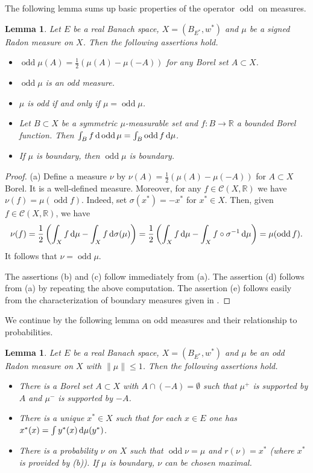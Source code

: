 \documentclass{amsart}
\numberwithin{equation}{section}
\newtheorem{lemma}[thm]{Lemma}
\theoremstyle{definition}
\def\C{\mathcal C}
\def\er{\mathbb R}
\def\odd{\operatorname{odd}}
\def\di{\,\mbox{\rm d}}
\begin{document}
The following lemma sums up basic properties of the operator $\odd$ on measures.

\begin{lemma}\label{l:odd-miry}
Let $E$ be a real Banach space, $X=(B_{E^*},w^*)$ and $\mu$ be a signed Radon measure on $X$.
Then the following assertions hold.
\begin{itemize}
	\item[(a)] $\odd\mu(A)=\frac12(\mu(A)-\mu(-A))$ for any  Borel set $A\subset X$.
	\item[(b)] $\odd\mu$ is an odd measure.
	\item[(c)] $\mu$ is odd if and only if $\mu=\odd\mu$.
	\item[(d)] Let $B\subset X$ be a symmetric $\mu$-measurable set and $f:B\to \er$ a bounded Borel function. Then $\int_B f\di\odd\mu=\int_B\odd
 f\di\mu$.
 \item[(e)] If $\mu$ is boundary, then $\odd\mu$ is boundary.
\end{itemize}
\end{lemma}

\begin{proof} (a) Define a measure $\nu$ by $\nu(A)=\frac12(\mu(A)-\mu(-A))$ for $A\subset X$ Borel. It is a well-defined measure. Moreover, for any $f\in\C(X,\er)$ we have $\nu(f)=\mu(\odd f)$. Indeed, set $\sigma(x^*)=-x^*$ for $x^*\in X$. Then, given $f\in\C(X,\er)$, we have
$$\nu(f)=\frac12\left(\int_X f\di\mu-\int_X f\di\sigma(\mu)\right)=\frac12\left(\int_X f\di\mu-\int_X f\circ \sigma^{-1}\di\mu\right)=\mu(\odd f).$$
It follows that $\nu=\odd\mu$.

The assertions (b) and (c) follow immediately from (a). The assertion (d) follows from (a) by repeating the above computation.
The assertion (e) follows easily from the characterization of boundary measures given in \cite[p. 34--35]{alfsen}.
 \end{proof}

We continue by the following lemma on odd measures and their relationship to probabilities.

\begin{lemma}\label{l:odd-miry2}
Let $E$ be a real Banach space, $X=(B_{E^*},w^*)$ and $\mu$ be an odd Radon measure on $X$ with $\|\mu\|\le 1$.
Then the following assertions hold.
\begin{itemize}
	\item[(a)] There is a Borel set $A\subset X$ with $A\cap(-A)=\emptyset$ such that $\mu^+$ is supported by $A$ and $\mu^-$ is supported by $-A$.
	\item[(b)] There is a unique $x^*\in X$ such that for each $x\in E$ one has $x^*(x)=\int y^*(x)\di\mu(y^*)$.
	\item[(c)] There is a probability $\nu$ on $X$ such that $\odd\nu=\mu$ and $r(\nu)=x^*$ (where $x^*$ is provided by (b)).
	If $\mu$ is boundary, $\nu$ can be chosen maximal.
\end{itemize}
\end{lemma}
\end{document}
